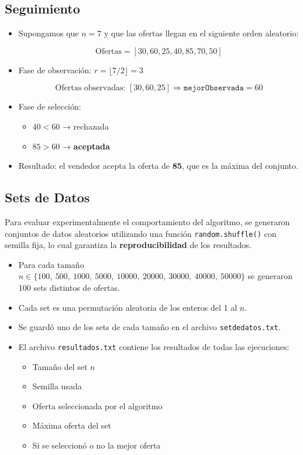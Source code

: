 \documentclass[a4paper, 12pt]{article}
\begin{document}
\subsection{Seguimiento}
\begin{itemize}
    \item Supongamos que $n = 7$ y que las ofertas llegan en el siguiente orden aleatorio:
    
    \[
    \text{Ofertas} = [30, 60, 25, 40, 85, 70, 50]
    \]
    
    \item Fase de observación: $r = \lfloor 7/2 \rfloor = 3$
    
    \[
    \text{Ofertas observadas: } [30, 60, 25] \Rightarrow \texttt{mejorObservada} = 60
    \]
    
    \item Fase de selección:
    \begin{itemize}
        \item $40 < 60$ → rechazada
        \item $85 > 60$ → \textbf{aceptada}
    \end{itemize}
    
    \item Resultado: el vendedor acepta la oferta de \textbf{85}, que es la máxima del conjunto.
\end{itemize}


\subsection{Sets de Datos}

Para evaluar experimentalmente el comportamiento del algoritmo, se generaron conjuntos de datos aleatorios utilizando una función \texttt{random.shuffle()} con semilla fija, lo cual garantiza la \textbf{reproducibilidad} de los resultados.

\begin{itemize}
    \item Para cada tamaño $n \in \{100,\ 500,\ 1000,\ 5000,\ 10000,\ 20000,\ 30000,\ 40000,\ 50000\}$ se generaron 100 sets distintos de ofertas.
    \item Cada set es una permutación aleatoria de los enteros del 1 al $n$.
    \item Se guardó uno de los sets de cada tamaño en el archivo \texttt{setdedatos.txt}.
    \item El archivo \texttt{resultados.txt} contiene los resultados de todas las ejecuciones:
    \begin{itemize}
        \item Tamaño del set $n$
        \item Semilla usada
        \item Oferta seleccionada por el algoritmo
        \item Máxima oferta del set
        \item Si se seleccionó o no la mejor oferta
    \end{itemize}
\end{itemize}
\end{document}
